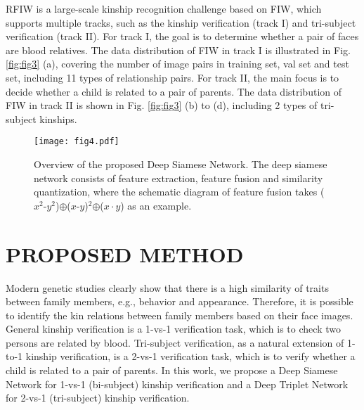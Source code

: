\documentclass[a4paper, 10pt, conference]{ieeeconf}      %
\begin{document}
RFIW \cite{c35} is a large-scale kinship recognition challenge based on FIW, which supports multiple tracks, such as the kinship verification (track I) and tri-subject verification (track II). For track I, the goal is to determine whether a pair of faces are blood relatives. The data distribution of FIW in track I is illustrated in Fig. \ref{fig:fig3} (a), covering the number of image pairs in training set, val set and test set, including 11 types of relationship pairs. For track II, the main focus is to decide whether a child is related to a pair of parents. The data distribution of FIW in track II is shown in Fig. \ref{fig:fig3} (b) to (d), including  2 types of tri-subject kinships.




\begin{figure*}[htp]
\setlength{\abovecaptionskip}{0.0cm}
\setlength{\belowcaptionskip}{-0.0cm}
\begin{minipage}[b]{1.0\linewidth}
  \centering
  \centerline{\texttt{[image: fig4.pdf]}}
\end{minipage}
\caption{Overview of the proposed Deep Siamese Network. The deep siamese network consists of feature extraction, feature fusion and similarity quantization, where the schematic diagram of feature fusion takes ($x^2$-$y^2$)$\oplus$($x$-$y$)$^2$$\oplus$($x \cdot y$) as an example.}
\label{fig:fig4}
\end{figure*}

\section{PROPOSED METHOD}

Modern genetic studies clearly show that there is a high similarity of traits between family members, e.g., behavior and appearance. Therefore, it is possible to identify the kin relations between family members based on their face images. General kinship verification is a 1-vs-1 verification task, which is to check two persons are related by blood. Tri-subject verification, as a natural extension of 1-to-1 kinship verification, is a 2-vs-1 verification task, which is to verify whether a child is related to a pair of parents. In this work, we propose a Deep Siamese Network for 1-vs-1 (bi-subject) kinship verification and a Deep Triplet Network for 2-vs-1 (tri-subject) kinship verification.
\end{document}
